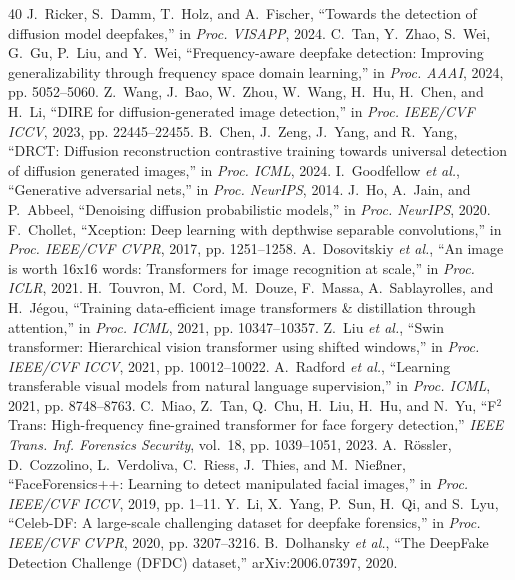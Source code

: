 \documentclass[journal]{IEEEtran}
\begin{document}
\begin{thebibliography}{40}
 J.~Ricker, S.~Damm, T.~Holz, and A.~Fischer, ``Towards the detection of diffusion model deepfakes,'' in \textit{Proc. VISAPP}, 2024.
 C.~Tan, Y.~Zhao, S.~Wei, G.~Gu, P.~Liu, and Y.~Wei, ``Frequency-aware deepfake detection: Improving generalizability through frequency space domain learning,'' in \textit{Proc. AAAI}, 2024, pp. 5052--5060.
 Z.~Wang, J.~Bao, W.~Zhou, W.~Wang, H.~Hu, H.~Chen, and H.~Li, ``DIRE for diffusion-generated image detection,'' in \textit{Proc. IEEE/CVF ICCV}, 2023, pp. 22445--22455.
 B.~Chen, J.~Zeng, J.~Yang, and R.~Yang, ``DRCT: Diffusion reconstruction contrastive training towards universal detection of diffusion generated images,'' in \textit{Proc. ICML}, 2024.
 I.~Goodfellow \textit{et al.}, ``Generative adversarial nets,'' in \textit{Proc. NeurIPS}, 2014.
 J.~Ho, A.~Jain, and P.~Abbeel, ``Denoising diffusion probabilistic models,'' in \textit{Proc. NeurIPS}, 2020.
 F.~Chollet, ``Xception: Deep learning with depthwise separable convolutions,'' in \textit{Proc. IEEE/CVF CVPR}, 2017, pp. 1251--1258.
 A.~Dosovitskiy \textit{et al.}, ``An image is worth 16x16 words: Transformers for image recognition at scale,'' in \textit{Proc. ICLR}, 2021.
 H.~Touvron, M.~Cord, M.~Douze, F.~Massa, A.~Sablayrolles, and H.~J\'egou, ``Training data-efficient image transformers \& distillation through attention,'' in \textit{Proc. ICML}, 2021, pp. 10347--10357.
 Z.~Liu \textit{et al.}, ``Swin transformer: Hierarchical vision transformer using shifted windows,'' in \textit{Proc. IEEE/CVF ICCV}, 2021, pp. 10012--10022.
 A.~Radford \textit{et al.}, ``Learning transferable visual models from natural language supervision,'' in \textit{Proc. ICML}, 2021, pp. 8748--8763.
 C.~Miao, Z.~Tan, Q.~Chu, H.~Liu, H.~Hu, and N.~Yu, ``F$^2$Trans: High-frequency fine-grained transformer for face forgery detection,'' \textit{IEEE Trans. Inf. Forensics Security}, vol.~18, pp. 1039--1051, 2023.
 A.~R\"ossler, D.~Cozzolino, L.~Verdoliva, C.~Riess, J.~Thies, and M.~Nie{\ss}ner, ``FaceForensics++: Learning to detect manipulated facial images,'' in \textit{Proc. IEEE/CVF ICCV}, 2019, pp. 1--11.
 Y.~Li, X.~Yang, P.~Sun, H.~Qi, and S.~Lyu, ``Celeb-DF: A large-scale challenging dataset for deepfake forensics,'' in \textit{Proc. IEEE/CVF CVPR}, 2020, pp. 3207--3216.
 B.~Dolhansky \textit{et al.}, ``The DeepFake Detection Challenge (DFDC) dataset,'' arXiv:2006.07397, 2020.

\end{thebibliography}
\end{document}
